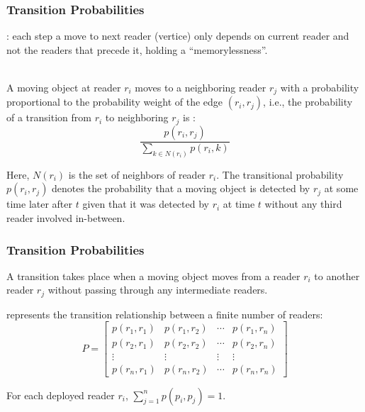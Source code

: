 \begin{frame}
\frametitle{Transition Probabilities}

: each step a move to next reader (vertice) only depends on current reader and not the readers that precede it, holding a ``memorylessness''.\\~\\ \pause

A moving object at reader $r_i$ moves to a neighboring reader $r_j$ with a probability proportional to the probability weight of the edge $(r_i, r_j)$, i.e., the probability of a transition from $r_i$ to neighboring $r_j$ is : \pause
\begin{equation}
  \frac{p(r_i, r_j)}{\sum_{k \in N(r_i)}p(r_i, k)}
\end{equation}

\pause
Here, $N(r_i)$ is the set of neighbors of reader $r_i$. The transitional probability $p(r_i, r_j)$ denotes the probability that a moving object is detected by $r_j$ at some time later after $t$ given that it was detected by $r_i$ at time $t$ without any third reader involved in-between.

\end{frame}


\begin{frame}
\frametitle{Transition Probabilities}

\begin{definition}[Transition]
  A transition takes place when a moving object moves from a reader $r_i$ to another reader $r_j$ without passing through any intermediate readers.
\end{definition}

\vspace{10pt}

 represents the transition relationship between a finite number of readers:
\begin{equation}
  P = \begin{bmatrix}
p(r_1, r_1) & p(r_1, r_2) & \cdots & p(r_1, r_n)\\
p(r_2, r_1) & p(r_2, r_2) & \cdots & p(r_2, r_n)\\
\vdots & \vdots & \vdots & \vdots\\
p(r_n, r_1) & p(r_n, r_2) & \cdots & p(r_n, r_n)
\end{bmatrix}
\end{equation}

\vspace{5pt}

For each deployed reader $r_i$, $\sum_{j=1}^{n}p(p_i,p_j) = 1$.

\end{frame}

